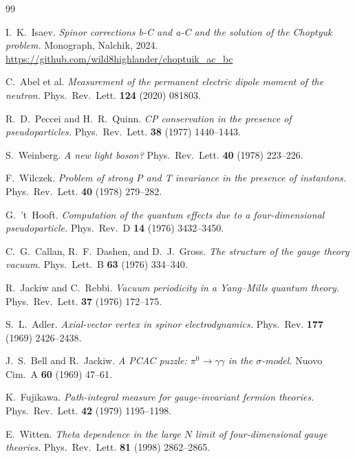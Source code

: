 \documentclass[11pt,a4paper]{article}
\theoremstyle{plain}
\theoremstyle{definition}
\theoremstyle{remark}
\begin{document}
\begin{thebibliography}{99}
\small

I.~K.~Isaev.
\textit{Spinor corrections b-C and a-C and the solution of the Choptyuk problem.}
Monograph, Nalchik, 2024.
\url{https://github.com/wild8highlander/choptuik_ac_bc}

C.~Abel et al.
\textit{Measurement of the permanent electric dipole moment of the neutron.}
Phys.~Rev.~Lett. \textbf{124} (2020) 081803.

R.~D.~Peccei and H.~R.~Quinn.
\textit{CP conservation in the presence of pseudoparticles.}
Phys.~Rev.~Lett. \textbf{38} (1977) 1440--1443.

S.~Weinberg.
\textit{A new light boson?}
Phys.~Rev.~Lett. \textbf{40} (1978) 223--226.

F.~Wilczek.
\textit{Problem of strong P and T invariance in the presence of instantons.}
Phys.~Rev.~Lett. \textbf{40} (1978) 279--282.

G.~'t~Hooft.
\textit{Computation of the quantum effects due to a four-dimensional pseudoparticle.}
Phys.~Rev.~D \textbf{14} (1976) 3432--3450.

C.~G.~Callan, R.~F.~Dashen, and D.~J.~Gross.
\textit{The structure of the gauge theory vacuum.}
Phys.~Lett.~B \textbf{63} (1976) 334--340.

R.~Jackiw and C.~Rebbi.
\textit{Vacuum periodicity in a Yang--Mills quantum theory.}
Phys.~Rev.~Lett. \textbf{37} (1976) 172--175.

S.~L.~Adler.
\textit{Axial-vector vertex in spinor electrodynamics.}
Phys.~Rev. \textbf{177} (1969) 2426--2438.

J.~S.~Bell and R.~Jackiw.
\textit{A PCAC puzzle: $\pi^0\to\gamma\gamma$ in the $\sigma$-model.}
Nuovo Cim.~A \textbf{60} (1969) 47--61.

K.~Fujikawa.
\textit{Path-integral measure for gauge-invariant fermion theories.}
Phys.~Rev.~Lett. \textbf{42} (1979) 1195--1198.

E.~Witten.
\textit{Theta dependence in the large $N$ limit of four-dimensional gauge theories.}
Phys.~Rev.~Lett. \textbf{81} (1998) 2862--2865.


\end{thebibliography}
\end{document}
